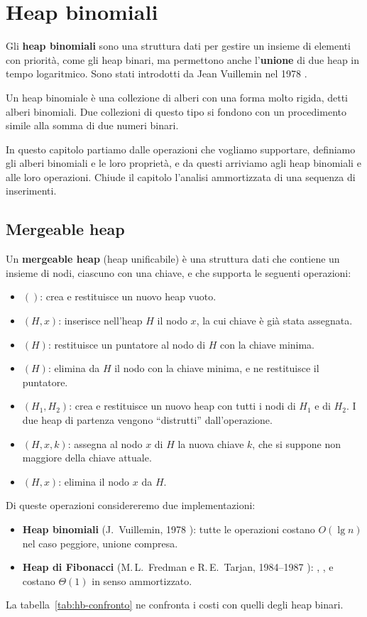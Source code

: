 \chapter{Heap binomiali}\label{ch:heap-binomiali}
Gli \textbf{heap binomiali} sono una struttura dati per gestire un insieme di elementi con priorità, come gli heap binari, ma permettono anche l'\textbf{unione} di due heap in tempo logaritmico. Sono stati introdotti da Jean Vuillemin nel 1978 \cite{Vuillemin1978}.

Un heap binomiale è una collezione di alberi con una forma molto rigida, detti alberi binomiali. Due collezioni di questo tipo si fondono con un procedimento simile alla somma di due numeri binari.

In questo capitolo partiamo dalle operazioni che vogliamo supportare, definiamo gli alberi binomiali e le loro proprietà, e da questi arriviamo agli heap binomiali e alle loro operazioni. Chiude il capitolo l'analisi ammortizzata di una sequenza di inserimenti.

\section{Mergeable heap}\label{sec:hb-mergeable}
Un \textbf{mergeable heap} (heap unificabile) è una struttura dati che contiene un insieme di nodi, ciascuno con una chiave, e che supporta le seguenti operazioni:
\begin{itemize}
    \item \MakeHeap$()$: crea e restituisce un nuovo heap vuoto.
    \item \Insert$(H,x)$: inserisce nell'heap $H$ il nodo $x$, la cui chiave è già stata assegnata.
    \item \Minimum$(H)$: restituisce un puntatore al nodo di $H$ con la chiave minima.
    \item \ExtractMin$(H)$: elimina da $H$ il nodo con la chiave minima, e ne restituisce il puntatore.
    \item \Union$(H_1,H_2)$: crea e restituisce un nuovo heap con tutti i nodi di $H_1$ e di $H_2$. I due heap di partenza vengono ``distrutti'' dall'operazione.
    \item \DecreaseKey$(H,x,k)$: assegna al nodo $x$ di $H$ la nuova chiave $k$, che si suppone non maggiore della chiave attuale.
    \item \Delete$(H,x)$: elimina il nodo $x$ da $H$.
\end{itemize}
Di queste operazioni considereremo due implementazioni:
\begin{itemize}
    \item \textbf{Heap binomiali} (J.~Vuillemin, 1978 \cite{Vuillemin1978}): tutte le operazioni costano $O(\lg n)$ nel caso peggiore, unione compresa.
    \item \textbf{Heap di Fibonacci} (M.\,L.~Fredman e R.\,E.~Tarjan, 1984--1987 \cite{Fredman1987}): \Insert{}, \Minimum{}, \Union{} e \DecreaseKey{} costano $\Theta(1)$ in senso ammortizzato.
\end{itemize}
La tabella~\ref{tab:hb-confronto} ne confronta i costi con quelli degli heap binari.

